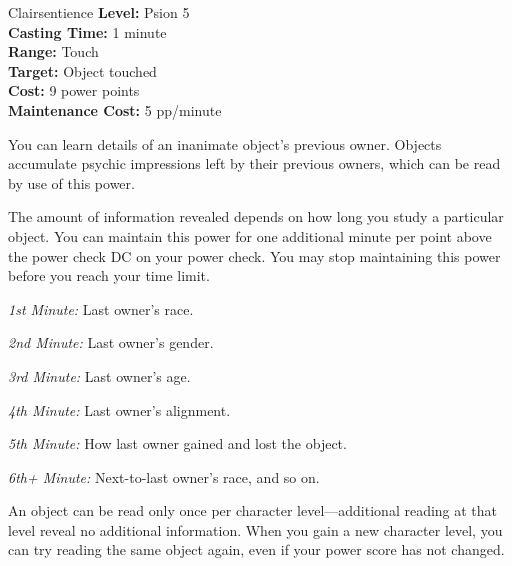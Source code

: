 {Clairsentience}
{
	\textbf{Level:}
	Psion 5\\
	\textbf{Casting Time:}
	1 minute\\
	\textbf{Range:}
	Touch\\
	\textbf{Target:}
	Object touched\\
	\textbf{Cost:}
	9 power points\\
	\textbf{Maintenance Cost:}
	5 pp/minute\\
}
{
	You can learn details of an inanimate object's previous owner. Objects accumulate psychic impressions left by their previous owners, which can be read by use of this power.

	The amount of information revealed depends on how long you study a particular object. You can maintain this power for one additional minute per point above the power check DC on your power check. You may stop maintaining this power before you reach your time limit.

	\textit{1st Minute:} Last owner's race.

	\textit{2nd Minute:} Last owner's gender.

	\textit{3rd Minute:} Last owner's age.

	\textit{4th Minute:} Last owner's alignment.

	\textit{5th Minute:} How last owner gained and lost the object.

	\textit{6th+ Minute:} Next-to-last owner's race, and so on.

	An object can be read only once per character level---additional reading at that level reveal no additional information. When you gain a new character level, you can try reading the same object again, even if your power score has not changed.
}